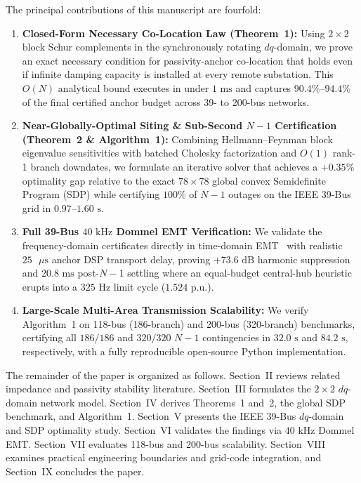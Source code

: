\documentclass[10pt,twocolumn]{article}
\begin{document}
The principal contributions of this manuscript are fourfold:
\begin{enumerate}[leftmargin=*,itemsep=2pt,topsep=3pt]
    \item \textbf{Closed-Form Necessary Co-Location Law (Theorem~1):} Using $2\times 2$ block Schur complements in the synchronously rotating $dq$-domain, we prove an exact necessary condition for passivity-anchor co-location that holds even if infinite damping capacity is installed at every remote substation. This $O(N)$ analytical bound executes in under $1\text{ ms}$ and captures $90.4\%$--$94.4\%$ of the final certified anchor budget across 39- to 200-bus networks.
    \item \textbf{Near-Globally-Optimal Siting \& Sub-Second $N-1$ Certification (Theorem~2 \& Algorithm~1):} Combining Hellmann--Feynman block eigenvalue sensitivities with batched Cholesky factorization and $O(1)$ rank-1 branch downdates, we formulate an iterative solver that achieves a $+0.35\%$ optimality gap relative to the exact $78\times 78$ global convex Semidefinite Program (SDP) while certifying $100\%$ of $N-1$ outages on the IEEE 39-Bus grid in $0.97$--$1.60\text{ s}$.
    \item \textbf{Full 39-Bus $40\text{ kHz}$ Dommel EMT Verification:} We validate the frequency-domain certificates directly in time-domain EMT~\cite{dommel1969digital} with realistic $25\text{ }\mu\text{s}$ anchor DSP transport delay, proving $+73.6\text{ dB}$ harmonic suppression and $20.8\text{ ms}$ post-$N-1$ settling where an equal-budget central-hub heuristic erupts into a $325\text{ Hz}$ limit cycle ($1.524\text{ p.u.}$).
    \item \textbf{Large-Scale Multi-Area Transmission Scalability:} We verify Algorithm~1 on 118-bus (186-branch) and 200-bus (320-branch) benchmarks, certifying all $186/186$ and $320/320$ $N-1$ contingencies in $32.0\text{ s}$ and $84.2\text{ s}$, respectively, with a fully reproducible open-source Python implementation.
\end{enumerate}

The remainder of the paper is organized as follows. Section~II reviews related impedance and passivity stability literature. Section~III formulates the $2\times 2$ $dq$-domain network model. Section~IV derives Theorems~1 and~2, the global SDP benchmark, and Algorithm~1. Section~V presents the IEEE 39-Bus $dq$-domain and SDP optimality study. Section~VI validates the findings via $40\text{ kHz}$ Dommel EMT. Section~VII evaluates 118-bus and 200-bus scalability. Section~VIII examines practical engineering boundaries and grid-code integration, and Section~IX concludes the paper.
\end{document}
